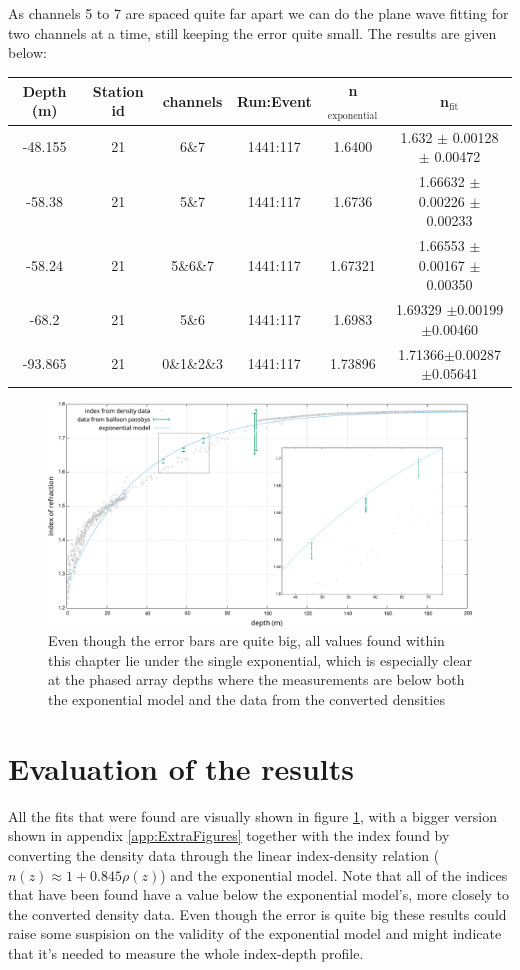 As channels 5 to 7 are spaced quite far apart we can do the plane wave fitting 
for two channels at a time, still keeping the error quite small. The results are given below:
\begin{center}
\begin{tabular}{||c c c c c c||}
 \hline
 Depth (m) & Station id & channels & Run:Event & n$_\text{exponential}$ & n$_\text{fit}$\\ 
 \hline\hline
 -48.155 & 21 & 6\&7 & 1441:117 & 1.6400 & 1.632 $\pm$ 0.00128 $\pm$ 0.00472\\
 -58.38 & 21 & 5\&7 & 1441:117 & 1.6736 & 1.66632 $\pm$ 0.00226 $\pm$ 0.00233 \\
 -58.24 & 21 & 5\&6\&7 & 1441:117 & 1.67321 & 1.66553 $\pm$ 0.00167 $\pm$ 0.00350 \\
 -68.2 & 21 & 5\&6 & 1441:117 & 1.6983 & 1.69329 $\pm$0.00199$\pm$0.00460 \\
 -93.865 & 21 & 0\&1\&2\&3 & 1441:117 & 1.73896 & 1.71366$\pm$0.00287$\pm$0.05641\\
 \hline
\end{tabular}
\end{center}
\begin{figure}
	\centering
	\includegraphics[width=\textwidth]{figures/ResultWithZoom.pdf}
  \caption{Even though the error bars are quite big, all values found within this chapter lie under the single exponential, 
    which is especially clear at the phased array depths where the measurements
    are below both the exponential model and the data from the converted densities}
	\label{fig:Results}
\end{figure}
\section{Evaluation of the results}
All the fits that were found are visually shown in figure \ref{fig:Results}, with a bigger
version shown in appendix \ref{app:ExtraFigures} together
with the index found by converting the density data through the linear index-density relation
($n(z) \approx 1 + 0.845\rho(z)$) and the exponential model.
Note that all of the indices that have been found have a value below the
exponential model's, more closely to the converted density data.
Even though the error is quite big these results could raise some
suspision on the validity of the exponential model and might indicate
that it's needed to measure the whole index-depth profile.

